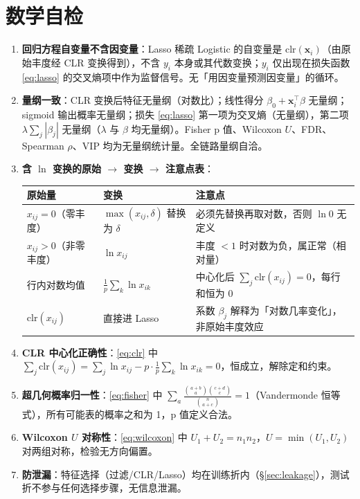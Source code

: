 \documentclass{internal-report}
\begin{document}
\section{数学自检}

\begin{enumerate}
  \item \textbf{回归方程自变量不含因变量}：Lasso 稀疏 Logistic 的自变量是 $\mathrm{clr}(\mathbf{x}_i)$（由原始丰度经 CLR 变换得到），不含 $y_i$ 本身或其代数变换；$y_i$ 仅出现在损失函数 \eqref{eq:lasso} 的交叉熵项中作为监督信号。无「用因变量预测因变量」的循环。
  \item \textbf{量纲一致}：CLR 变换后特征无量纲（对数比）；线性得分 $\beta_0+\mathbf{x}_i^{\top}\beta$ 无量纲；sigmoid 输出概率无量纲；损失 \eqref{eq:lasso} 第一项为交叉熵（无量纲），第二项 $\lambda\sum_j|\beta_j|$ 无量纲（$\lambda$ 与 $\beta$ 均无量纲）。Fisher p 值、Wilcoxon $U$、FDR、Spearman $\rho$、VIP 均为无量纲统计量。全链路量纲自洽。
  \item \textbf{含 $\ln$ 变换的原始 $\to$ 变换 $\to$ 注意点表}：
  \begin{center}
  \footnotesize
  \begin{tabular}{p{3.4cm}p{4.6cm}p{5.4cm}}
  \toprule
  原始量 & 变换 & 注意点 \\
  \midrule
  $x_{ij}=0$（零丰度） & $\max(x_{ij},\delta)$ 替换为 $\delta$ & 必须先替换再取对数，否则 $\ln 0$ 无定义 \\
  $x_{ij}>0$（非零丰度） & $\ln x_{ij}$ & 丰度 $<1$ 时对数为负，属正常（相对量） \\
  行内对数均值 & $\frac{1}{p}\sum_k\ln x_{ik}$ & 中心化后 $\sum_j\mathrm{clr}(x_{ij})=0$，每行和恒为 0 \\
  $\mathrm{clr}(x_{ij})$ & 直接进 Lasso & 系数 $\beta_j$ 解释为「对数几率变化」，非原始丰度效应 \\
  \bottomrule
  \end{tabular}
  \end{center}
  \item \textbf{CLR 中心化正确性}：\eqref{eq:clr} 中 $\sum_j\mathrm{clr}(x_{ij})=\sum_j\ln x_{ij}-p\cdot\frac{1}{p}\sum_k\ln x_{ik}=0$，恒成立，解除定和约束。
  \item \textbf{超几何概率归一性}：\eqref{eq:fisher} 中 $\sum_{a}\frac{\binom{a+b}{a}\binom{c+d}{c}}{\binom{n}{a+c}}=1$（Vandermonde 恒等式），所有可能表的概率之和为 1，p 值定义合法。
  \item \textbf{Wilcoxon $U$ 对称性}：\eqref{eq:wilcoxon} 中 $U_1+U_2=n_1n_2$，$U=\min(U_1,U_2)$ 对两组对称，检验无方向偏置。
  \item \textbf{防泄漏}：特征选择（过滤/CLR/Lasso）均在训练折内（\S\ref{sec:leakage}），测试折不参与任何选择步骤，无信息泄漏。
\end{enumerate}
\end{document}
